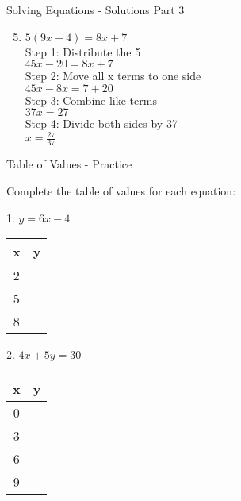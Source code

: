 \documentclass[aspectratio=169]{beamer}
\begin{document}
\begin{frame}{Solving Equations - Solutions Part 3}
    \begin{tcolorbox}[colback=lightgray,colframe=accent,title=Detailed Solutions]
        \begin{enumerate}
            \setcounter{enumi}{4}
            \item $5(9x - 4) = 8x + 7$ \\
                Step 1: Distribute the 5 \\
                $45x - 20 = 8x + 7$ \\
                Step 2: Move all x terms to one side \\
                $45x - 8x = 7 + 20$ \\
                Step 3: Combine like terms \\
                $37x = 27$ \\
                Step 4: Divide both sides by 37 \\
                $x = \frac{27}{37}$
        \end{enumerate}
    \end{tcolorbox}
\end{frame}

\begin{frame}{Table of Values - Practice}
    \begin{tcolorbox}[colback=lightgray,colframe=primary,title=Practice Problems]
        \footnotesize
        Complete the table of values for each equation:
        
        1. $y = 6x - 4$
        \vspace*{-1.5em}
        \begin{center}
        \begin{tabular}{|c|c|}
            \hline
            \rowcolor{primary!20} x & y \\
            \hline
            2 & \\
            5 & \\
            8 & \\
            \hline
        \end{tabular}
        \end{center}
        
        2. $4x + 5y = 30$
        \vspace*{-1.5em}
        \begin{center}
        \begin{tabular}{|c|c|}
            \hline
            \rowcolor{primary!20} x & y \\
            \hline
            0 & \\
            3 & \\
            6 & \\
            9 & \\
            \hline
        \end{tabular}
        \end{center}
    \end{tcolorbox}
    \vfill
\end{frame}
\end{document}
